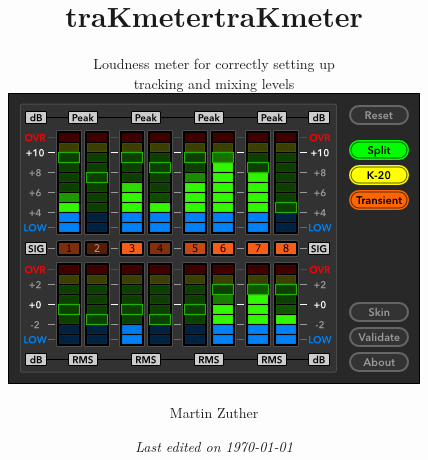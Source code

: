 


\title{traKmeter}
\author{Martin Zuther}



\title{traKmeter}

\subtitle{
  \normalsize{\textrm{\textmd{
        \vfill
        Loudness meter for correctly setting up \\
        tracking and mixing levels
        \vfill
        \vspace{1.5em}
        \includegraphics[scale=0.45,clip]{include/images/trakmeter.png}
        \vfill
      }}}
}

\author{}

\date{\emph{Last edited on \today}}

